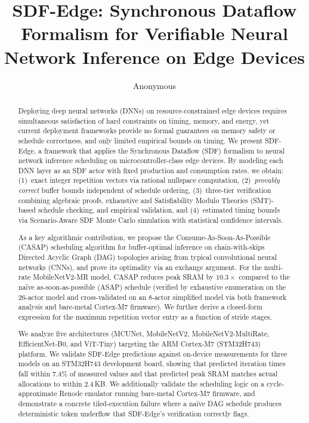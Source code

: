 \documentclass[journal]{IEEEtran}
\title{SDF-Edge: Synchronous Dataflow Formalism for Verifiable Neural Network Inference on Edge Devices}
\author{Anonymous}
\begin{document}
\maketitle

\begin{abstract}
Deploying deep neural networks (DNNs) on resource-constrained edge devices requires simultaneous satisfaction of hard constraints on timing, memory, and energy, yet current deployment frameworks provide no formal guarantees on memory safety or schedule correctness, and only limited empirical bounds on timing.
We present SDF-Edge, a framework that applies the Synchronous Dataflow (SDF) formalism to neural network inference scheduling on microcontroller-class edge devices.
By modeling each DNN layer as an SDF actor with fixed production and consumption rates, we obtain:
(1)~exact integer repetition vectors via rational nullspace computation,
(2)~\emph{provably correct} buffer bounds independent of schedule ordering,
(3)~three-tier verification combining algebraic proofs, exhaustive and Satisfiability Modulo Theories (SMT)-based schedule checking, and empirical validation, and
(4)~estimated timing bounds via Scenario-Aware SDF Monte Carlo simulation with statistical confidence intervals.

As a key algorithmic contribution, we propose the Consume-As-Soon-As-Possible (CASAP) scheduling algorithm for buffer-optimal inference on chain-with-skips Directed Acyclic Graph (DAG) topologies arising from typical convolutional neural networks (CNNs), and prove its optimality via an exchange argument.
For the multi-rate MobileNetV2-MR model, CASAP reduces peak SRAM by $10.3\times$ compared to the na\"ive as-soon-as-possible (ASAP) schedule (verified by exhaustive enumeration on the 26-actor model and cross-validated on an 8-actor simplified model via both framework analysis and bare-metal Cortex-M7 firmware).
We further derive a closed-form expression for the maximum repetition vector entry as a function of stride stages.

We analyze five architectures (MCUNet, MobileNetV2, MobileNetV2-MultiRate, EfficientNet-B0, and ViT-Tiny) targeting the ARM Cortex-M7 (STM32H743) platform.
We validate SDF-Edge predictions against on-device measurements for three models on an STM32H743 development board, showing that predicted iteration times fall within 7.4\% of measured values and that predicted peak SRAM matches actual allocations to within 2.4\,KB.
We additionally validate the scheduling logic on a cycle-approximate Renode emulator running bare-metal Cortex-M7 firmware, and demonstrate a concrete tiled-execution failure where a na\"ive DAG schedule produces deterministic token underflow that SDF-Edge's verification correctly flags.
\end{abstract}
\end{document}
